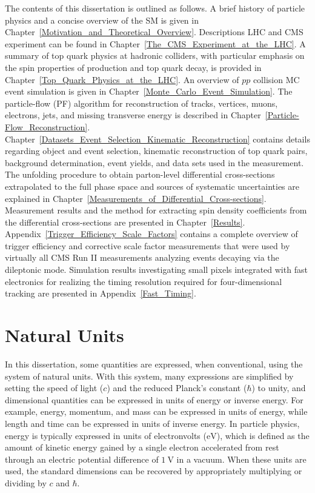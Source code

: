 The contents of this dissertation is outlined as follows.
A brief history of particle physics and a concise overview of the SM is given in Chapter~\ref{Motivation_and_Theoretical_Overview}.
Descriptions LHC and CMS experiment can be found in Chapter~\ref{The_CMS_Experiment_at_the_LHC}.
A summary of top quark physics at hadronic colliders, with particular emphasis on the spin properties of \ttbar production and top quark decay, is provided in Chapter~\ref{Top_Quark_Physics_at_the_LHC}. 
An overview of $pp$ collision MC event simulation is given in Chapter~\ref{Monte_Carlo_Event_Simulation}.
The particle-flow (PF) algorithm for reconstruction of tracks, vertices, muons, electrons, jets, and missing transverse energy is described in Chapter~\ref{Particle-Flow_Reconstruction}.
Chapter~\ref{Datasets_Event_Selection_Kinematic_Reconstruction} contains details regarding object and event selection, kinematic reconstruction of top quark pairs, background determination, event yields, and data sets used in the measurement.
The unfolding procedure to obtain parton-level differential cross-sections extrapolated to the full phase space and sources of systematic uncertainties are explained in Chapter~\ref{Measurements_of_Differential_Cross-sections}.
Measurement results and the method for extracting spin density coefficients from the differential cross-sections are presented in Chapter~\ref{Results}.
Appendix~\ref{Trigger_Efficiency_Scale_Factors} contains a complete overview of trigger efficiency and corrective scale factor measurements that were used by virtually all CMS Run II measurements analyzing \ttbar events decaying via the dileptonic mode.
Simulation results investigating small pixels integrated with fast electronics for realizing the timing resolution required for four-dimensional tracking are presented in Appendix~\ref{Fast_Timing}.

\section{Natural Units}
In this dissertation, some quantities are expressed, when conventional, using the system of natural units.
With this system, many expressions are simplified by setting the speed of light ($c$) and the reduced Planck's constant ($\hbar$) to unity, and dimensional quantities can be expressed in units of energy or inverse energy.
For example, energy, momentum, and mass can be expressed in units of energy, while length and time can be expressed in units of inverse energy.
In particle physics, energy is typically expressed in units of electronvolts ($\si{\eV}$), which is defined as the amount of kinetic energy gained by a single electron accelerated from rest through an electric potential difference of $\SI{1}{\V}$ in a vacuum.
When these units are used, the standard dimensions can be recovered by appropriately multiplying or dividing by $c$ and $\hbar$.